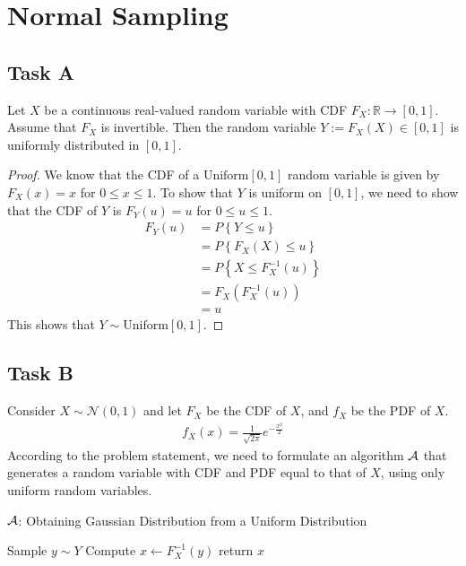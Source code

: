 \section{Normal Sampling}
\subsection*{Task A}
\begin{theorem}\label{thm:invertgauss}
	Let $X$ be a continuous real-valued random variable with CDF $F_X:\mathbb{R}\to [0,1]$.
	Assume that $F_X$ is invertible. Then the random variable $Y:=F_X(X) \in [0,1]$ is uniformly distributed in $[0,1]$.
\end{theorem}
\begin{proof}
	We know that the CDF of a $\textrm{Uniform}[0,1]$ random variable is given by $F_X(x) = x$ for $0\leq x\leq 1$.
	To show that $Y$ is uniform on $[0, 1]$, we need to show that the CDF of $Y$ is $F_Y(u) = u$ for $0 \leq u \leq 1$.
	\begin{align*}
		F_Y(u) & = P\left\{Y \leq u\right\}           \\
		       & = P\left\{F_X(X) \leq u\right\}      \\
		       & = P\left\{X \leq F_X^{-1}(u)\right\} \\
		       & = F_X\left(F_X^{-1}(u)\right)        \\
		       & = u
	\end{align*}
	This shows that $Y \sim \textrm{Uniform}[0,1]$.
\end{proof}

\subsection*{Task B}
Consider $X \sim \mathcal{N}(0,1)$ and let $F_X$ be the CDF of $X$, and $f_X$ be the PDF of $X$.
\begin{align*}
	f_X(x) = \frac{1}{\sqrt{2\pi}}e^{-\frac{x^2}{2}}
\end{align*}
According to the problem statement, we need to formulate an algorithm $\cal{A}$ that generates a random variable with CDF and PDF equal to that of $X$, using only uniform random variables.

\begin{algorithm}
	\caption{$\cal{A}$: Obtaining Gaussian Distribution from a Uniform Distribution}
	\begin{algorithmic}
		\State Sample $y \sim Y$
		\State Compute $x \gets F_X^{-1}(y)$
		\State return $x$
	\end{algorithmic}
\end{algorithm}

